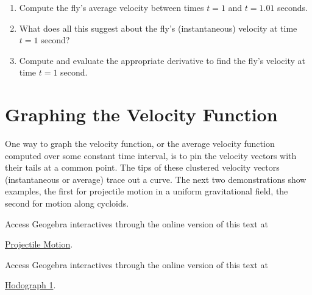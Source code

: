 \documentclass{ximera}
\begin{document}
\begin{exploration}
\begin{question}
\begin{enumerate}
\item Compute the fly's average velocity  between times $t=1$ and $t=1.01$ seconds.

\item What does all this suggest about the fly's (instantaneous) velocity at time $t=1$ second?

\item Compute and evaluate the appropriate derivative to find the fly's velocity at time $t=1$ second.


\end{enumerate}
\end{question}


\section{Graphing the Velocity Function}
One way to graph the velocity function, or the average velocity function computed over some constant time interval, is to pin the velocity vectors with their tails at a common point. The tips of these clustered velocity vectors (instantaneous or average) trace out a curve. The next two demonstrations show examples, the first for projectile motion in a uniform gravitational field, the second for motion along cycloids.

Access Geogebra interactives through the online version of this text at
 
\href{https://www.geogebra.org/classic/egzphw3q}{Projectile Motion}.

\end{exploration}



\begin{exploration}
\begin{onlineOnly}
    \begin{center}
\end{center}
\end{onlineOnly}


Access Geogebra interactives through the online version of this text at

 
\href{https://www.geogebra.org/classic/jdsf9ttr}{Hodograph 1}.

\end{exploration}




\begin{exploration}
 
\begin{onlineOnly}
    \begin{center}
\end{center}
\end{onlineOnly}
\end{exploration}
\end{document}
